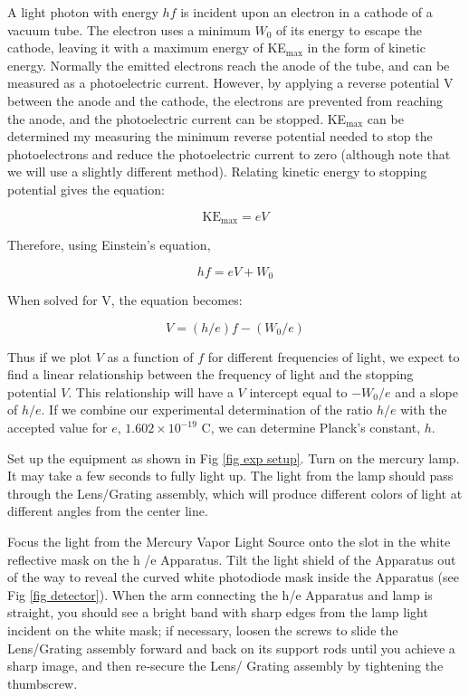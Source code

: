 \documentclass[11pt]{article}
\begin{document}
A light photon with energy $hf$ is incident upon an electron in a cathode of a
vacuum tube. The electron uses a minimum $W_0$ of its energy to escape the cathode,
leaving it with a maximum energy of KE$_\textrm{max}$ in the form of kinetic energy. Normally the
emitted electrons reach the anode of the tube, and can be measured as a photoelectric
current. However, by applying a reverse potential V between the anode and the cathode,
the electrons are prevented from reaching the anode, and the photoelectric current can be stopped. KE$_\textrm{max}$ can be determined my measuring the
minimum reverse potential needed to stop the photoelectrons and reduce the photoelectric
current to zero (although note that we will use a slightly different method). Relating kinetic energy to stopping potential gives the
equation:

\begin{equation}
  \textrm{KE}_\textrm{max} = eV
\end{equation}

Therefore, using Einstein's equation,

\begin{equation}
  hf = eV + W_0
\end{equation}

When solved for V, the equation becomes:

\begin{equation}
  V = (h/e)f - (W_0/e)
\end{equation}

Thus if we plot $V$ as a function of $f$ for different frequencies of light, we expect
to find a linear relationship between the frequency of light and the stopping potential
$V$. This relationship will have a $V$ intercept equal to $-W_0/e$ and a slope of $h/e$. If we combine our experimental
determination of the ratio $h/e$ with the accepted value for $e$, $1.602 \times
10^{-19}$ C, we can determine Planck's constant, $h$.

\vspace{5mm}


Set up the equipment as shown in Fig \ref{fig exp setup}. Turn on the mercury lamp. It may take a few seconds to fully light up. The light from the lamp should pass through the Lens/Grating assembly, which will produce different colors of light at different angles from the center line. 

Focus the light from
the Mercury Vapor Light Source onto the slot in the white reflective mask on the
h /e Apparatus. Tilt the light shield of the Apparatus out of the way to reveal
the curved white photodiode mask inside the Apparatus (see Fig \ref{fig detector}).
When the arm connecting the h/e Apparatus and lamp is straight, you should see a bright band with sharp edges from the lamp light incident on the
white mask; if necessary, loosen the screws to slide the Lens/Grating assembly forward and 
back on its support rods until you achieve a sharp image, and then re-secure the Lens/
Grating assembly by tightening the thumbscrew. 
\end{document}
